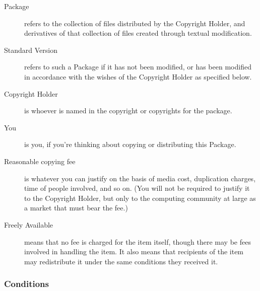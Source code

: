 \begin{description}

	\item[Package] refers to the collection of files distributed by the
	Copyright Holder, and derivatives of that collection of files
	created through textual modification.

	\item[Standard Version] refers to such a Package if it has not been
	modified, or has been modified in accordance with the wishes
	of the Copyright Holder as specified below.

	\item[Copyright Holder] is whoever is named in the copyright or
	copyrights for the package.

	\item[You] is you, if you're thinking about copying or distributing
	this Package.

	\item[Reasonable copying fee] is whatever you can justify on the
	basis of media cost, duplication charges, time of people involved,
	and so on.  (You will not be required to justify it to the
	Copyright Holder, but only to the computing community at large
	as a market that must bear the fee.)

	\item[Freely Available] means that no fee is charged for the item
	itself, though there may be fees involved in handling the item.
	It also means that recipients of the item may redistribute it
	under the same conditions they received it.

\end{description}

\subsubsection{Conditions}

